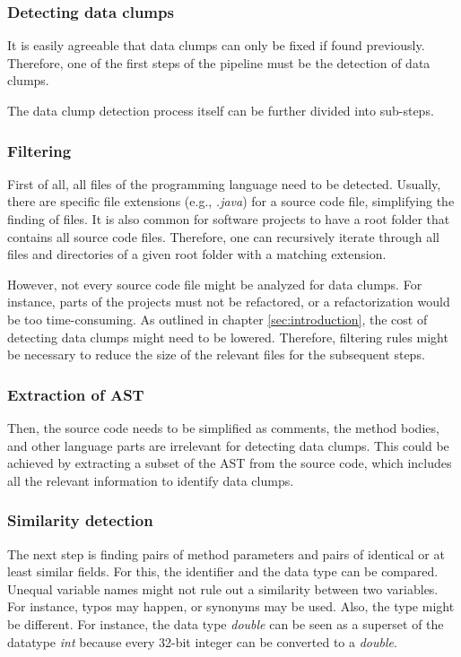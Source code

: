 \subsubsection{Detecting data clumps}\label{subsec:chap3_data_clump_detection}
It is easily agreeable that data clumps can only be fixed if found previously. Therefore, one of the first steps of the pipeline must be the detection of data clumps. 

The data clump detection process itself can be further divided into sub-steps.
\subsubsection{Filtering}\label{subsub:filtering_files}
First of all, all files of the programming language need to be detected. Usually, there are specific file extensions (e.g., \textit{.java}) for a source code file, simplifying the finding of files. It is also common for software projects to have a root folder that contains all source code files. Therefore, one can recursively iterate through all files and directories of a given root folder with a matching extension. 

However, not every source code file might be analyzed for data clumps. For instance, parts of the projects must not be refactored, or a refactorization would be too time-consuming. As outlined in chapter \ref{sec:introduction}, the cost of detecting data clumps might need to be lowered. Therefore, filtering rules might be necessary to reduce the size of the relevant files for the subsequent steps.  

\subsubsection{Extraction of AST}
Then,  the source code needs to be simplified as comments, the method bodies, and other language parts are irrelevant for detecting data clumps. This could be achieved by extracting a subset of the \ac{AST} from the source code, which includes all the relevant information to identify data clumps.
\subsubsection{Similarity detection}

The next step is finding pairs of method parameters and pairs of identical or at least similar fields. For this, the identifier and the data type can be compared. Unequal variable names might not rule out a similarity between two variables. For instance, typos may happen, or synonyms may be used. Also, the type might be different. For instance, the data type \textit{double} can be seen as a superset of the datatype \textit{int} because every 32-bit integer can be converted to a \textit{double}.

